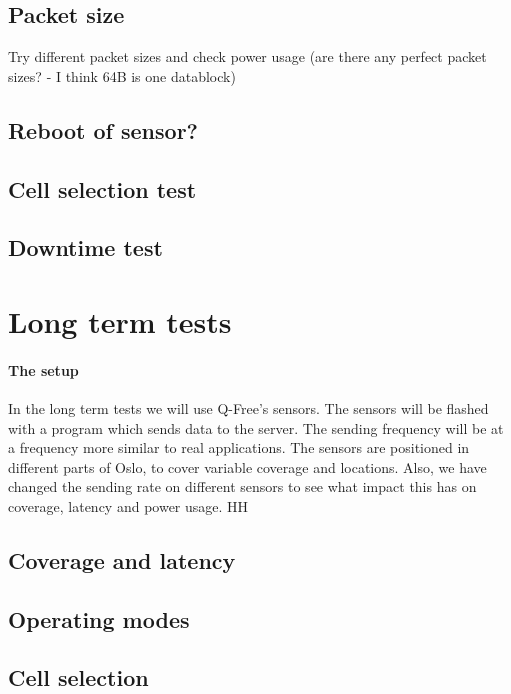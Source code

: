 \documentclass[USenglish]{ifimaster}  %
\begin{document}
\subsection{Packet size} \label{ssection:packetsize}
Try different packet sizes and check power usage (are there any perfect packet sizes? - I think 64B is one datablock)

\subsection{Reboot of sensor?} \label{ssection:reboottest}

\subsection{Cell selection test} \label{ssection:cellselectiontest}

\subsection{Downtime test} \label{ssection:downtimetest}


\section{Long term tests} \label{section:longtermtest}

\paragraph{The setup}
In the long term tests we will use Q-Free's sensors. The sensors will be flashed with a program which sends data to the server. The sending frequency will be at a frequency more similar to real applications. The sensors are positioned in different parts of Oslo, to cover variable coverage and locations. Also, we have changed the sending rate on different sensors to see what impact this has on coverage, latency and power usage. HH

\subsection{Coverage and latency}

\subsection{Operating modes}

\subsection{Cell selection}
\end{document}

